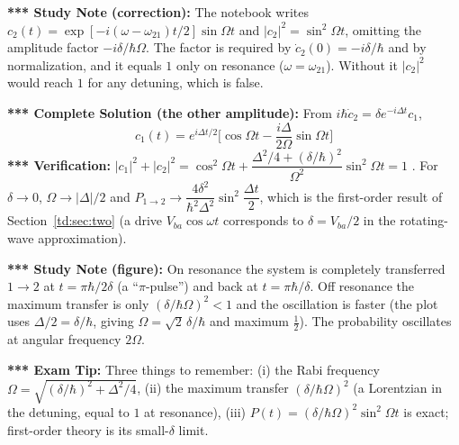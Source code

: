 \documentclass[11pt,a4paper]{article}
\begin{document}
\textbf{*** Study Note (correction):} The notebook writes $c_2(t)=\exp[-i(\omega-\omega_{21})t/2]\sin\Omega t$ and $|c_2|^2=\sin^2\Omega t$, omitting the amplitude factor $-i\delta/\hbar\Omega$. The factor is required by $\dot c_2(0)=-i\delta/\hbar$ and by normalization, and it equals $1$ only on resonance ($\omega=\omega_{21}$). Without it $|c_2|^2$ would reach $1$ for any detuning, which is false.

\textbf{*** Complete Solution (the other amplitude):} From $i\hbar\dot c_2=\delta e^{-i\Delta t}c_1$,
\[
c_1(t)=e^{i\Delta t/2}\Big[\cos\Omega t-\frac{i\Delta}{2\Omega}\sin\Omega t\Big]
\]
\textbf{*** Verification:} $|c_1|^2+|c_2|^2=\cos^2\Omega t+\dfrac{\Delta^2/4+(\delta/\hbar)^2}{\Omega^2}\sin^2\Omega t=1$ \checkmark. For $\delta\to0$, $\Omega\to|\Delta|/2$ and $P_{1\to2}\to\dfrac{4\delta^2}{\hbar^2\Delta^2}\sin^2\dfrac{\Delta t}2$, which is the first-order result of Section~\ref{td:sec:two} (a drive $V_{ba}\cos\omega t$ corresponds to $\delta=V_{ba}/2$ in the rotating-wave approximation).

\begin{center}
\end{center}
\textbf{*** Study Note (figure):} On resonance the system is completely transferred $1\to2$ at $t=\pi\hbar/2\delta$ (a ``$\pi$-pulse'') and back at $t=\pi\hbar/\delta$. Off resonance the maximum transfer is only $(\delta/\hbar\Omega)^2<1$ and the oscillation is faster (the plot uses $\Delta/2=\delta/\hbar$, giving $\Omega=\sqrt2\,\delta/\hbar$ and maximum $\tfrac12$). The probability oscillates at angular frequency $2\Omega$.

\textbf{*** Exam Tip:} Three things to remember: (i) the Rabi frequency $\Omega=\sqrt{(\delta/\hbar)^2+\Delta^2/4}$, (ii) the maximum transfer $(\delta/\hbar\Omega)^2$ (a Lorentzian in the detuning, equal to $1$ at resonance), (iii) $P(t)=(\delta/\hbar\Omega)^2\sin^2\Omega t$ is exact; first-order theory is its small-$\delta$ limit.
\end{document}
